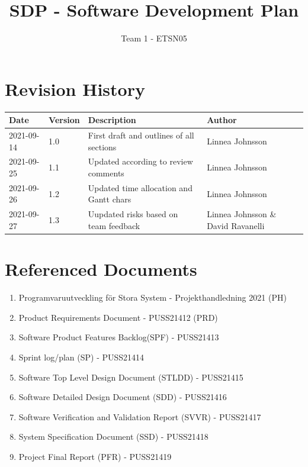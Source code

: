 \documentclass{article}
\title{SDP - Software Development Plan}
\author{Team 1 - ETSN05}
\begin{document}
\date{}
\maketitle
\thispagestyle{fancy}
\newpage

\section*{Revision History}
\begin{table}[h]
    \centering
    \begin{tabular}{|l|l|p{55mm}|p{35mm}|}
    \hline
    Date & Version & Description & Author \\ 
    \hline\hline 
    2021-09-14 & 1.0 & First draft and outlines of all sections & Linnea Johnsson \\
    \hline
    2021-09-25 & 1.1 & Updated according to review comments & Linnea Johnsson \\ 
    \hline
    2021-09-26 & 1.2 & Updated time allocation and Gantt chars & Linnea Johnsson  \\ 
    \hline
    2021-09-27 & 1.3 & Uupdated risks based on team feedback & Linnea Johnsson \& David Ravanelli \\ 
    \hline
    \end{tabular}
    \label{tab:history}
\end{table}
\newpage
 
\section*{Referenced Documents}\label{refdoc}
\begin{enumerate}
    \item Programvaruutveckling för Stora System - Projekthandledning 2021 (PH)
    \item Product Requirements Document - PUSS21412 (PRD)
    \item Software Product Features Backlog(SPF) - PUSS21413
    \item Sprint log/plan (SP) - PUSS21414
    \item Software Top Level Design Document (STLDD) - PUSS21415
    \item Software Detailed Design Document (SDD) - PUSS21416
    \item Software Verification and Validation Report (SVVR) - PUSS21417
    \item System Specification Document (SSD) - PUSS21418
    \item Project Final Report (PFR) - PUSS21419

\end{enumerate}
\newpage
\end{document}
